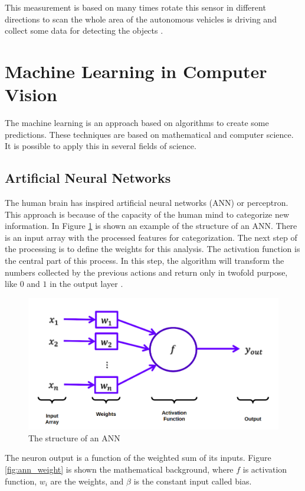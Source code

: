 This measurement is based on many times rotate this sensor in different directions to scan the whole area of the autonomous vehicles is driving and collect some data for detecting the objects \cite{gao2018object}.

\section{Machine Learning in Computer Vision}\label{ml-ai}
The machine learning is an approach based on algorithms to create some predictions. These techniques are based on mathematical and computer science. It is possible to apply this in several fields of science. 
\subsection{Artificial Neural Networks}

The human brain has inspired artificial neural networks (ANN) or perceptron. This approach is because of the capacity of the human mind to categorize new information. In Figure \ref{fig:ann} is shown an example of the structure of an ANN. There is an input array with the processed features for categorization. The next step of the processing is to define the weights for this analysis. The activation function is the central part of this process. In this step, the algorithm will transform the numbers collected by the previous actions and return only in twofold purpose, like $0$ and $1$ in the output layer \cite{goodfellow2016deep}.

\begin{figure}[H]
\centering
\includegraphics[width=\columnwidth]{imagens/ann.png}
\caption{The structure of an ANN \cite{lecture}}
\label{fig:ann}
\end{figure}

The neuron output is a function of the weighted sum of its inputs. Figure \ref{fig:ann_weight} is shown the mathematical background, where $f$ is activation function, $w_i$ are the weights, and $\beta$ is the constant input called bias.


